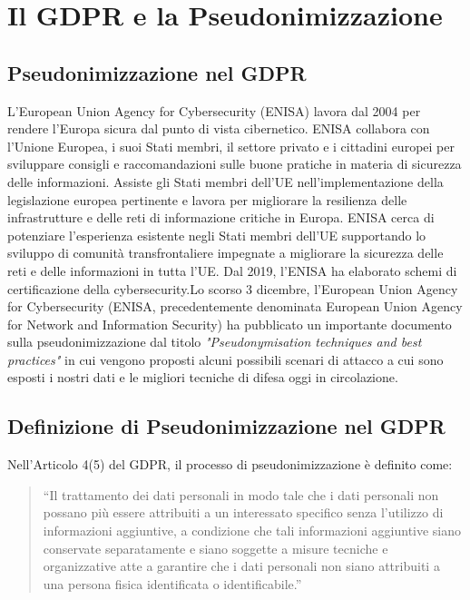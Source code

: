 \chapter{Il GDPR e la Pseudonimizzazione}


\section{Pseudonimizzazione nel GDPR}

L'European Union Agency for Cybersecurity (ENISA) lavora dal 2004 per rendere l'Europa sicura dal punto di vista cibernetico. ENISA collabora con l'Unione Europea, i suoi Stati membri, il settore privato e i cittadini europei per sviluppare consigli e raccomandazioni sulle buone pratiche in materia di sicurezza delle informazioni. Assiste gli Stati membri dell'UE nell'implementazione della legislazione europea pertinente e lavora per migliorare la resilienza delle infrastrutture e delle reti di informazione critiche in Europa. ENISA cerca di potenziare l'esperienza esistente negli Stati membri dell'UE supportando lo sviluppo di comunità transfrontaliere impegnate a migliorare la sicurezza delle reti e delle informazioni in tutta l'UE. Dal 2019, l'ENISA ha elaborato schemi di certificazione della cybersecurity.Lo scorso 3 dicembre, l'European Union Agency for Cybersecurity (ENISA, precedentemente denominata European Union Agency for Network and Information Security) ha pubblicato un importante documento sulla pseudonimizzazione dal titolo \textit{"Pseudonymisation techniques and best practices"} in cui vengono proposti alcuni possibili scenari di attacco a cui sono esposti i nostri dati e le migliori tecniche di difesa oggi in circolazione.

\newpage

\section{Definizione di Pseudonimizzazione nel GDPR}
Nell'Articolo 4(5) del GDPR, il processo di pseudonimizzazione è definito come:
\begin{quote}
“Il trattamento dei dati personali in modo tale che i dati personali non possano più essere attribuiti a un interessato specifico senza l'utilizzo di informazioni aggiuntive, a condizione che tali informazioni aggiuntive siano conservate separatamente e siano soggette a misure tecniche e organizzative atte a garantire che i dati personali non siano attribuiti a una persona fisica identificata o identificabile.”
\end{quote}

